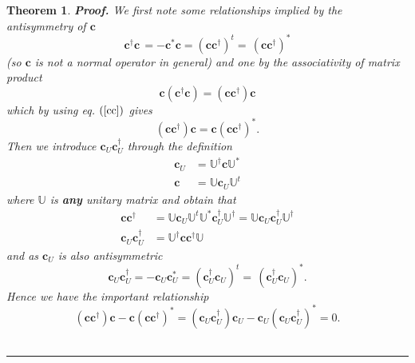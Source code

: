 \documentclass[preprint,aps,showkeys]{revtex4}%
\newtheorem{theorem}{Theorem}
\newenvironment{proof}[1][Proof]{\noindent\textbf{#1.} }{\ \rule{0.5em}{0.5em}}
\begin{document}
\begin{theorem}
\begin{proof}
We first note some relationships implied by the antisymmetry of $\mathbf{c}$%
\begin{equation}
\mathbf{c}^{\dagger}\mathbf{c\,=-c}^{\ast}\mathbf{c}=\left(  \mathbf{cc}%
^{\dagger}\right)  ^{t}=\mathbf{\,}\left(  \mathbf{cc}^{\dagger}\right)
^{\ast} \label{cc}%
\end{equation}
(so $\mathbf{c}$ is not a normal operator in general) and one by the
associativity of matrix product
\begin{equation}
\mathbf{c}\left(  \mathbf{c}^{\dagger}\mathbf{c}\right)  =\left(
\mathbf{cc}^{\dagger}\right)  \mathbf{c}%
\end{equation}
which by using eq. $\left(  \ref{cc}\right)  $ gives
\begin{equation}
\left(  \mathbf{cc}^{\dagger}\right)  \mathbf{c=c}\left(  \mathbf{cc}%
^{\dagger}\right)  ^{\ast}. \label{cr}%
\end{equation}
Then we introduce $\mathbf{c}_{U}\mathbf{c}_{U}^{\dagger}$ through the
definition
\begin{align}
\mathbf{c}_{U}  &  =\mathbb{U}^{\dagger}\mathbf{c}\mathbb{U}^{\ast}\nonumber\\
\mathbf{c}  &  =\mathbb{U}\mathbf{c}_{U}\mathbb{U}^{t}%
\end{align}
where $\mathbb{U}$ is \textbf{any} unitary matrix and obtain that
\begin{align}
\mathbf{cc}^{\dagger}  &  =\mathbb{U}\mathbf{c}_{U}\mathbb{U}^{t}%
\mathbb{U}^{\ast}\mathbf{c}_{U}^{\dagger}\mathbb{U}^{\dagger}=\mathbb{U}%
\mathbf{c}_{U}\mathbf{c}_{U}^{\dagger}\mathbb{U}^{\dagger}\nonumber\\
\mathbf{c}_{U}\mathbf{c}_{U}^{\dagger}  &  =\mathbb{U}^{\dagger}%
\mathbf{cc}^{\dagger}\mathbb{U}%
\end{align}
and as $\mathbf{c}_{U}$ is also antisymmetric
\begin{equation}
\mathbf{c}_{U}\mathbf{c}_{U}^{\dagger}=-\mathbf{c}_{U}\mathbf{c}_{U}^{\ast
}=\left(  \mathbf{c}_{U}^{\dagger}\mathbf{c}_{U}\right)  ^{t}=\mathbf{\,}%
\left(  \mathbf{c}_{U}^{\dagger}\mathbf{c}_{U}\right)  ^{\ast}.
\end{equation}
Hence we have the important relationship
\begin{equation}
\left(  \mathbf{cc}^{\dagger}\right)  \mathbf{c-c}\left(  \mathbf{cc}%
^{\dagger}\right)  ^{\ast}=\left(  \mathbf{c}_{U}\mathbf{c}_{U}^{\dagger
}\right)  \mathbf{c}_{U}-\mathbf{c}_{U}\left(  \mathbf{c}_{U}\mathbf{c}%
_{U}^{\dagger}\right)  ^{\ast}=0. \label{cu}%

\end{equation}
\end{proof}
\end{theorem}
\end{document}
